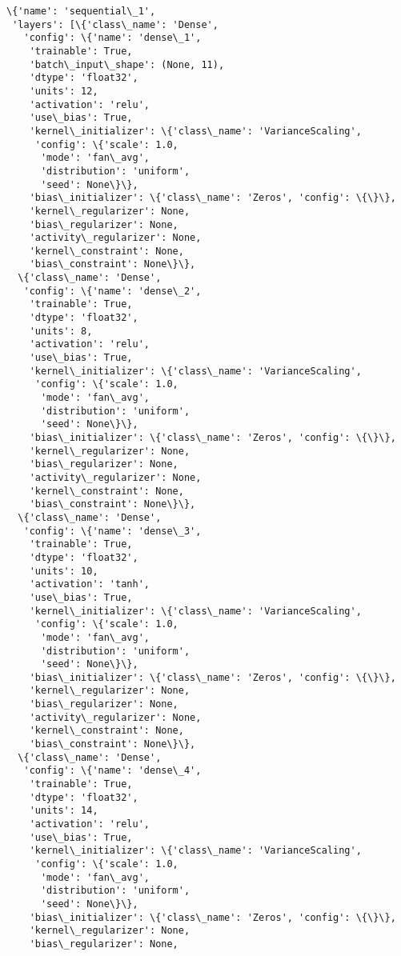 \documentclass[11pt]{article}
\makeatletter
\newcommand{\boxspacing}{\kern\kvtcb@left@rule\kern\kvtcb@boxsep}
\newcommand{\prompt}[4]{
        \ttfamily\llap{{\color{#2}[#3]:\hspace{3pt}#4}}\vspace{-\baselineskip}
    }
\makeatother
\begin{document}
            \begin{tcolorbox}[breakable, size=fbox, boxrule=.5pt, pad at break*=1mm, opacityfill=0]
\prompt{Out}{outcolor}{20}{\boxspacing}
\begin{Verbatim}[commandchars=\\\{\}]
\{'name': 'sequential\_1',
 'layers': [\{'class\_name': 'Dense',
   'config': \{'name': 'dense\_1',
    'trainable': True,
    'batch\_input\_shape': (None, 11),
    'dtype': 'float32',
    'units': 12,
    'activation': 'relu',
    'use\_bias': True,
    'kernel\_initializer': \{'class\_name': 'VarianceScaling',
     'config': \{'scale': 1.0,
      'mode': 'fan\_avg',
      'distribution': 'uniform',
      'seed': None\}\},
    'bias\_initializer': \{'class\_name': 'Zeros', 'config': \{\}\},
    'kernel\_regularizer': None,
    'bias\_regularizer': None,
    'activity\_regularizer': None,
    'kernel\_constraint': None,
    'bias\_constraint': None\}\},
  \{'class\_name': 'Dense',
   'config': \{'name': 'dense\_2',
    'trainable': True,
    'dtype': 'float32',
    'units': 8,
    'activation': 'relu',
    'use\_bias': True,
    'kernel\_initializer': \{'class\_name': 'VarianceScaling',
     'config': \{'scale': 1.0,
      'mode': 'fan\_avg',
      'distribution': 'uniform',
      'seed': None\}\},
    'bias\_initializer': \{'class\_name': 'Zeros', 'config': \{\}\},
    'kernel\_regularizer': None,
    'bias\_regularizer': None,
    'activity\_regularizer': None,
    'kernel\_constraint': None,
    'bias\_constraint': None\}\},
  \{'class\_name': 'Dense',
   'config': \{'name': 'dense\_3',
    'trainable': True,
    'dtype': 'float32',
    'units': 10,
    'activation': 'tanh',
    'use\_bias': True,
    'kernel\_initializer': \{'class\_name': 'VarianceScaling',
     'config': \{'scale': 1.0,
      'mode': 'fan\_avg',
      'distribution': 'uniform',
      'seed': None\}\},
    'bias\_initializer': \{'class\_name': 'Zeros', 'config': \{\}\},
    'kernel\_regularizer': None,
    'bias\_regularizer': None,
    'activity\_regularizer': None,
    'kernel\_constraint': None,
    'bias\_constraint': None\}\},
  \{'class\_name': 'Dense',
   'config': \{'name': 'dense\_4',
    'trainable': True,
    'dtype': 'float32',
    'units': 14,
    'activation': 'relu',
    'use\_bias': True,
    'kernel\_initializer': \{'class\_name': 'VarianceScaling',
     'config': \{'scale': 1.0,
      'mode': 'fan\_avg',
      'distribution': 'uniform',
      'seed': None\}\},
    'bias\_initializer': \{'class\_name': 'Zeros', 'config': \{\}\},
    'kernel\_regularizer': None,
    'bias\_regularizer': None,

\end{Verbatim}
\end{tcolorbox}
\end{document}
